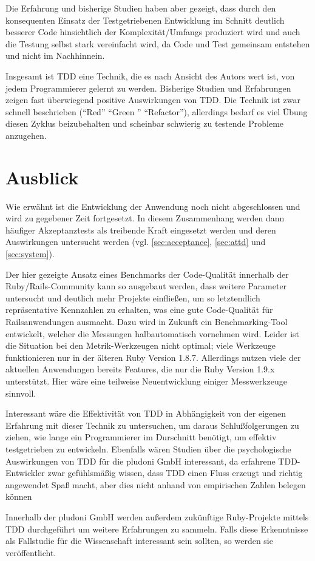 Die Erfahrung und bisherige Studien haben aber gezeigt, dass durch den konsequenten Einsatz der Testgetriebenen Entwicklung im Schnitt deutlich besserer Code hinsichtlich der Komplexität/Umfangs produziert wird und auch die Testung selbst stark vereinfacht wird, da Code und Test gemeinsam entstehen und nicht im Nachhinnein.

Insgesamt ist TDD eine Technik, die es nach Ansicht des Autors wert ist, von jedem Programmierer gelernt zu werden. Bisherige Studien und Erfahrungen zeigen fast überwiegend positive Auswirkungen von TDD. Die Technik ist zwar schnell beschrieben ("`Red"' "`Green "' "`Refactor"'), allerdings bedarf es viel Übung diesen Zyklus beizubehalten und scheinbar schwierig zu testende Probleme anzugehen.

\section{Ausblick}
Wie erwähnt ist die Entwicklung der Anwendung noch nicht abgeschlossen und wird zu gegebener Zeit fortgesetzt. In diesem Zusammenhang werden dann häufiger Akzeptanztests als treibende Kraft eingesetzt werden und deren Auswirkungen untersucht werden (vgl. \ref{sec:acceptance}, \ref{sec:attd} und \ref{sec:system}).

Der hier gezeigte Ansatz eines Benchmarks der Code-Qualität innerhalb der Ruby/Rails\hyp{}Community kann so ausgebaut werden, dass weitere Parameter untersucht und deutlich mehr Projekte einfließen, um so letztendlich repräsentative Kennzahlen zu erhalten, was eine gute Code-Qualität für Railsanwendungen ausmacht. Dazu wird in Zukunft ein Benchmarking\hyp{}Tool entwickelt, welcher die Messungen halbautomatisch vornehmen wird. Leider ist die Situation bei den Metrik-Werkzeugen nicht optimal; viele Werkzeuge funktionieren nur in der älteren Ruby Version 1.8.7. Allerdings nutzen viele der aktuellen Anwendungen bereits Features, die nur die Ruby Version 1.9.x unterstützt. Hier wäre eine teilweise Neuentwicklung einiger Messwerkzeuge sinnvoll.

Interessant wäre die Effektivität von TDD in Abhängigkeit von der eigenen Erfahrung mit dieser Technik zu untersuchen, um daraus Schlußfolgerungen zu ziehen, wie lange ein Programmierer im Durschnitt benötigt, um effektiv testgetrieben zu entwickeln. Ebenfalls wären Studien über die psychologische Auswirkungen von TDD für die pludoni GmbH interessant, da erfahrene TDD-Entwickler zwar gefühlsmäßig wissen, dass TDD einen Fluss erzeugt und richtig angewendet Spaß macht, aber dies nicht anhand von empirischen Zahlen belegen können

Innerhalb der pludoni GmbH werden außerdem zukünftige Ruby-Projekte mittels TDD durchgeführt um weitere Erfahrungen zu sammeln. Falls diese Erkenntnisse als Fallstudie für die Wissenschaft interessant sein sollten, so werden sie veröffentlicht.

